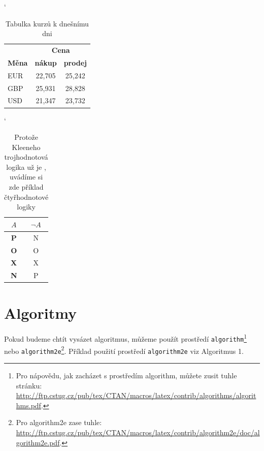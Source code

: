 \documentclass[11pt]{article}
\theoremstyle{plain}
\theoremstyle{plain}
\begin{document}
\begin{table}[h]
    \catcode`
    \begin{center}
        \begin{tabular}{|l|c|c|}
            \hline
                          & \multicolumn{2}{|c|}{\textbf{Cena}}                   \\
            \cline{2-3}
            \textbf{Měna} & \textbf{nákup}                      & \textbf{prodej} \\
            \hline
            EUR           & 22,705                              & 25,242          \\
            GBP           & 25,931                              & 28,828          \\
            USD           & 21,347                              & 23,732          \\
            \hline
        \end{tabular}
        \caption{Tabulka kurzů k dnešnímu dni}
    \end{center}
\end{table}

\begin{table}[h]
    \catcode`
    \begin{tabular}{|c|c|}
        \hline
        $A$        & $\neg A$ \\
        \hline
        \textbf{P} & N        \\
        \hline
        \textbf{O} & O        \\
        \hline
        \textbf{X} & X        \\
        \hline
        \textbf{N} & P        \\
        \hline
    \end{tabular}

    \caption{Protože Kleeneho trojhodnotová logika už je , uvádíme si zde příklad čtyřhodnotové logiky}
\end{table}


\section{Algoritmy}
Pokud budeme chtít vysázet algoritmus, můžeme použít prostředí \verb|algorithm|\footnote{Pro nápovědu, jak zacházet s prostředím algorithm, můžete zusit tuhle stránku: \url{http://ftp.cstug.cz/pub/tex/CTAN/macros/latex/contrib/algorithms/algorithms.pdf}.}
nebo \verb|algorithm2e|\footnote{Pro algorithm2e zase tuhle: \url{http://ftp.cstug.cz/pub/tex/CTAN/macros/latex/contrib/algorithm2e/doc/algorithm2e.pdf}.}.
Příklad použití prostředí \verb|algorithm2e| viz Algoritmus 1.
\end{document}
